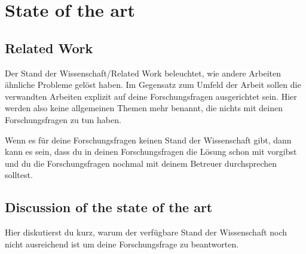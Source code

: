 \chapter{State of the art}
\section{Related Work}
Der Stand der Wissenschaft/Related Work beleuchtet, wie andere Arbeiten ähnliche Probleme gelöst haben. Im Gegensatz zum Umfeld der Arbeit sollen die verwandten Arbeiten explizit auf deine Forschungsfragen ausgerichtet sein. Hier werden also keine allgemeinen Themen mehr benannt, die nichts mit deinen Forschungsfragen zu tun haben.

Wenn es für deine Forschungsfragen keinen Stand der Wissenschaft gibt, dann kann es sein, dass du in deinen Forschungsfragen die Lösung schon mit vorgibst und du die Forschungsfragen nochmal mit deinem Betreuer durchsprechen solltest.
\section{Discussion of the state of the art}
Hier diskutierst du kurz, warum der verfügbare Stand der Wissenschaft noch nicht ausreichend ist um deine Forschungsfrage zu beantworten. 
